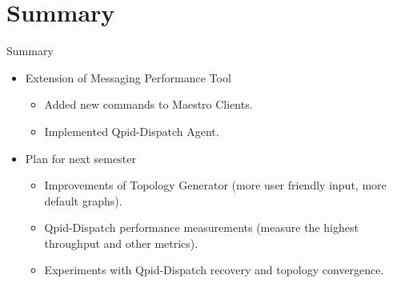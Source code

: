 \documentclass[hyperref={pdfpagelabels=false, unicode},pdf,slideColor,fyma,9pt]{beamer}
\begin{document}
		\section{Summary}
		\begin{frame}{Summary}
				\begin{itemize}
						\setlength\itemsep{0.5em}
						\item Extension of Messaging Performance Tool
						\vspace{0.5em}
						\begin{itemize}
							\setlength\itemsep{0.5em}
							\item Added new commands to Maestro Clients.
							\item Implemented Qpid-Dispatch Agent.
						\end{itemize}
						\vspace{1em}
						\item Plan for next semester
						\vspace{0.5em}
						\begin{itemize}
							\setlength\itemsep{0.5em}
							\item Improvements of Topology Generator (more user friendly input, more default graphs).
							\item Qpid-Dispatch performance measurements (measure the highest throughput and other metrics).
							\item Experiments with Qpid-Dispatch recovery and topology convergence.
						\end{itemize}
				\end{itemize}
		\end{frame}
\end{document}
